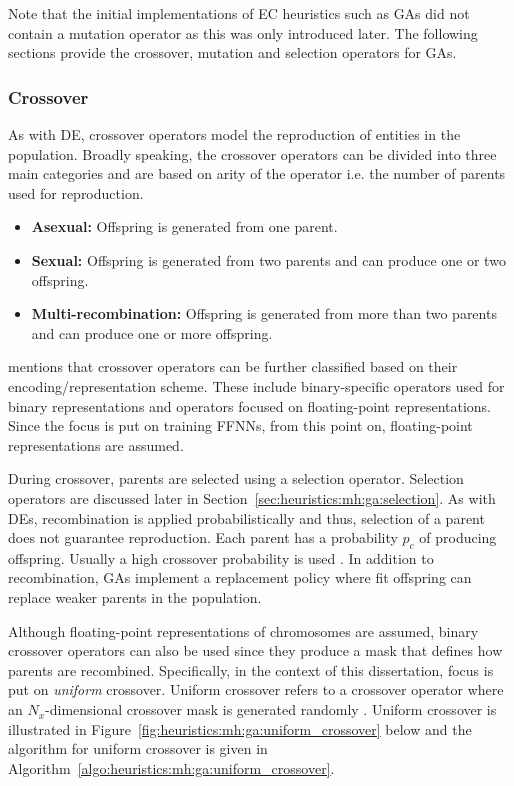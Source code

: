 Note that the initial implementations of \ac{EC} heuristics such as \acp{GA} did not contain a mutation operator as this was only introduced later. The following sections provide the crossover, mutation and selection operators for \acp{GA}.

\subsubsection{Crossover}
\label{sec:heuristics:mh:ga:crossover}

As with \ac{DE}, crossover operators model the reproduction of entities in the population. Broadly speaking, the crossover operators can be divided into three main categories \cite{ref:engelbrecht:2007} and are based on arity of the operator i.e. the number of parents used for reproduction.

\begin{itemize}
      \item \textbf{Asexual: } Offspring is generated from one parent.

      \item \textbf{Sexual: } Offspring is generated from two parents and can produce one or two offspring.

      \item \textbf{Multi-recombination: } Offspring is generated from more than two parents and can produce one or more offspring.
\end{itemize}

\citeauthor{ref:engelbrecht:2007}\cite{ref:engelbrecht:2007} mentions that crossover operators can be further classified based on their encoding/representation scheme. These include binary-specific operators used for binary representations and operators focused on floating-point representations. Since the focus is put on training \acp{FFNN}, from this point on, floating-point representations are assumed.

During crossover, parents are selected using a selection operator. Selection operators are discussed later in Section~\ref{sec:heuristics:mh:ga:selection}. As with \acp{DE}, recombination is applied probabilistically and thus, selection of a parent does not guarantee reproduction. Each parent has a probability $p_{c}$ of producing offspring. Usually a high crossover probability is used \cite{ref:engelbrecht:2007}. In addition to recombination, \acp{GA} implement a replacement policy where fit offspring can replace weaker parents in the population.

Although floating-point representations of chromosomes are assumed, binary crossover operators can also be used since they produce a mask that defines how parents are recombined. Specifically, in the context of this dissertation, focus is put on \textit{uniform} crossover. Uniform crossover refers to a crossover operator where an $N_{x}$-dimensional crossover mask is generated randomly \cite{ref:syswerda:1989}. Uniform crossover is illustrated in Figure~\ref{fig:heuristics:mh:ga:uniform_crossover} below and the algorithm for uniform crossover is given in Algorithm~\ref{algo:heuristics:mh:ga:uniform_crossover}.


